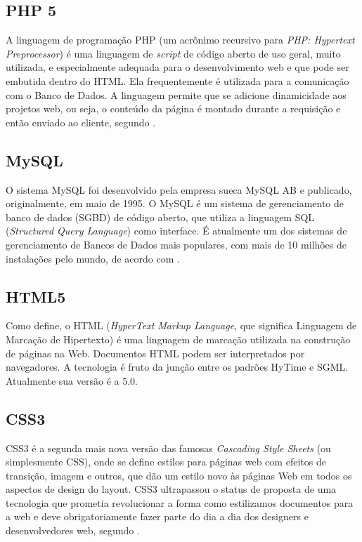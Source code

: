 \subsection{PHP 5}

A linguagem de programação PHP (um acrônimo recursivo para \textit{PHP: Hypertext Preprocessor}) é uma linguagem de \textit{script} de código aberto de uso geral, muito utilizada, e especialmente adequada para o desenvolvimento web e que pode ser embutida dentro do HTML. Ela frequentemente é utilizada para a comunicação com o Banco de Dados. A linguagem permite que se adicione dinamicidade aos projetos web, ou seja, o conteúdo da página é montado durante a requisição e então enviado ao cliente, segundo .

\subsection{MySQL}

O sistema MySQL foi desenvolvido pela empresa sueca MySQL AB e publicado, originalmente, em maio de 1995. O MySQL é um sistema de gerenciamento de banco de dados (SGBD) de código aberto, que utiliza a linguagem SQL (\textit{Structured Query Language}) como interface. É atualmente um dos sistemas de gerenciamento de Bancos de Dados mais populares, com mais de 10 milhões de instalações pelo mundo, de acordo com .

\subsection{HTML5}

Como  define, o HTML (\textit{HyperText Markup Language}, que significa Linguagem de Marcação de Hipertexto) é uma linguagem de marcação utilizada na construção de páginas na Web. Documentos HTML podem ser interpretados por navegadores. A tecnologia é fruto da junção entre os padrões HyTime e SGML. Atualmente sua versão é a 5.0.

\subsection{CSS3}

CSS3 é a segunda mais nova versão das famosas \textit{Cascading Style Sheets} (ou simplesmente CSS), onde se define estilos para páginas web com efeitos de transição, imagem e outros, que dão um estilo novo às páginas Web em todos os aspectos de design do layout. CSS3 ultrapassou o status de proposta de uma tecnologia que prometia revolucionar a forma como estilizamos documentos para a web e deve obrigatoriamente fazer parte do dia a dia dos designers e desenvolvedores web, segundo .


